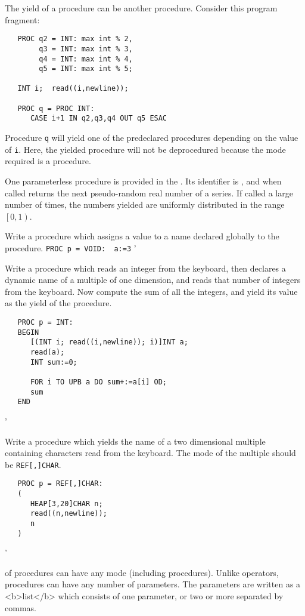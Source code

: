 The yield of a procedure can be another procedure. Consider this
program fragment:
\begin{verbatim}
   PROC q2 = INT: max int % 2,
        q3 = INT: max int % 3,
        q4 = INT: max int % 4,
        q5 = INT: max int % 5;

   INT i;  read((i,newline));

   PROC q = PROC INT:
      CASE i+1 IN q2,q3,q4 OUT q5 ESAC
\end{verbatim}
\noindent
Procedure \verb|q| will yield one of the predeclared procedures
depending on the value of \verb|i|. Here, the yielded procedure will
not be deprocedured because the mode required is a procedure.

One parameterless procedure is provided in the .
Its identifier is , and when called returns the next
pseudo-random real number of a series. If called a large number of
times, the numbers yielded are uniformly distributed in the range
$\left[0,1\right)$.

\begin{exercise}
\item Write a procedure which assigns a value to a name declared
globally to the procedure. \ans \verb|PROC p = VOID:  a:=3|
'
\item Write a procedure which reads an integer from the keyboard, then
declares a dynamic name of a multiple of one dimension, and reads that
number of integers from the keyboard. Now compute the sum of all the
integers, and yield its value as the yield of the procedure.
\ans \ %
\begin{verbatim}
   PROC p = INT:
   BEGIN
      [(INT i; read((i,newline)); i)]INT a;
      read(a);
      INT sum:=0;

      FOR i TO UPB a DO sum+:=a[i] OD;
      sum
   END
\end{verbatim}
'
\item Write a procedure which yields the name of a two dimensional
multiple containing characters read from the keyboard. The mode of
the multiple should be \verb|REF[,]CHAR|. \ans \ %
\begin{verbatim}
   PROC p = REF[,]CHAR:
   (
      HEAP[3,20]CHAR n;
      read((n,newline));
      n
   )
\end{verbatim}
'
\end{exercise}

 of procedures can have any
mode (including procedures).  Unlike operators, procedures can have
any number of parameters.  The parameters are written as a
 <b>list</b> which consists of one
parameter, or two or more separated by commas.

